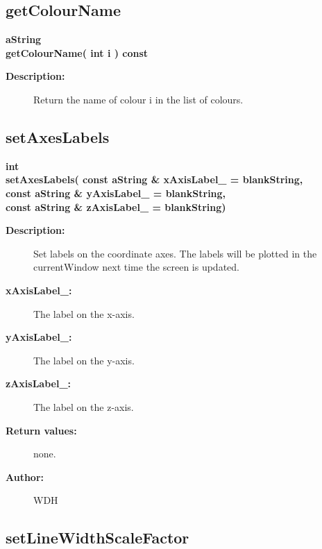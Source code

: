\subsection{getColourName}
 
\begin{flushleft} \textbf{%
aString  \\ 
\settowidth{\GLGraphicsInterfaceIncludeArgIndent}{getColourName(}%
getColourName( int i ) const
}\end{flushleft}
\begin{description}
\item[{\bf Description:}]   
     Return the name of colour i in the list of colours. 
\end{description}
\subsection{setAxesLabels}
 
\begin{flushleft} \textbf{%
int  \\ 
\settowidth{\GLGraphicsInterfaceIncludeArgIndent}{setAxesLabels(}%
setAxesLabels( const aString \& xAxisLabel\_  = blankString,\\ 
\hspace{\GLGraphicsInterfaceIncludeArgIndent}const aString \& yAxisLabel\_  = blankString,\\ 
\hspace{\GLGraphicsInterfaceIncludeArgIndent}const aString \& zAxisLabel\_  = blankString)
}\end{flushleft}
\begin{description}
\item[{\bf Description:}] 
   Set labels on the coordinate axes. The labels will be plotted in the currentWindow 
   next time the screen is updated.
\item[{\bf xAxisLabel\_:}]  The label on the x-axis.
\item[{\bf yAxisLabel\_:}]  The label on the y-axis.
\item[{\bf zAxisLabel\_:}]  The label on the z-axis.
\item[{\bf Return values:}]  none.

\item[{\bf Author:}]  WDH
\end{description}
\subsection{setLineWidthScaleFactor}
 
